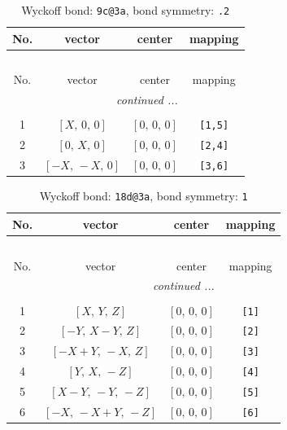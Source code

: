 \documentclass[fleqn,8pt]{jsarticle}
\begin{document}
\renewcommand{\arraystretch}{1.2}
\begin{longtable}{cccc}
\caption{Wyckoff bond: {\tt 9c@3a}, bond symmetry: {\tt .2}}
 \\
 \hline \hline
No. & vector & center & mapping \\ \hline \endfirsthead

\multicolumn{3}{l}{\tablename\ \thetable{}} \\
 \hline \hline
No. & vector & center & mapping \\ \hline \endhead

 \hline \hline
\multicolumn{3}{r}{\footnotesize\it continued ...} \\ \endfoot

 \hline \hline
\multicolumn{3}{r}{} \\ \endlastfoot

1 & $\left[ X,\, 0,\, 0 \right]$ & $\left[ 0,\, 0,\, 0 \right]$ & {\tt [1,5]} \\ \hline
2 & $\left[ 0,\, X,\, 0 \right]$ & $\left[ 0,\, 0,\, 0 \right]$ & {\tt [2,4]} \\ \hline
3 & $\left[ - X,\, - X,\, 0 \right]$ & $\left[ 0,\, 0,\, 0 \right]$ & {\tt [3,6]} \\
\end{longtable}
\renewcommand{\arraystretch}{1.2}
\begin{longtable}{cccc}
\caption{Wyckoff bond: {\tt 18d@3a}, bond symmetry: {\tt 1}}
 \\
 \hline \hline
No. & vector & center & mapping \\ \hline \endfirsthead

\multicolumn{3}{l}{\tablename\ \thetable{}} \\
 \hline \hline
No. & vector & center & mapping \\ \hline \endhead

 \hline \hline
\multicolumn{3}{r}{\footnotesize\it continued ...} \\ \endfoot

 \hline \hline
\multicolumn{3}{r}{} \\ \endlastfoot

1 & $\left[ X,\, Y,\, Z \right]$ & $\left[ 0,\, 0,\, 0 \right]$ & {\tt [1]} \\ \hline
2 & $\left[ - Y,\, X - Y,\, Z \right]$ & $\left[ 0,\, 0,\, 0 \right]$ & {\tt [2]} \\ \hline
3 & $\left[ - X + Y,\, - X,\, Z \right]$ & $\left[ 0,\, 0,\, 0 \right]$ & {\tt [3]} \\ \hline
4 & $\left[ Y,\, X,\, - Z \right]$ & $\left[ 0,\, 0,\, 0 \right]$ & {\tt [4]} \\ \hline
5 & $\left[ X - Y,\, - Y,\, - Z \right]$ & $\left[ 0,\, 0,\, 0 \right]$ & {\tt [5]} \\ \hline
6 & $\left[ - X,\, - X + Y,\, - Z \right]$ & $\left[ 0,\, 0,\, 0 \right]$ & {\tt [6]} \\
\end{longtable}
\end{document}
